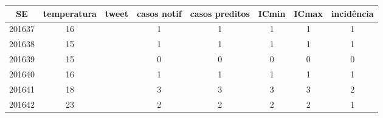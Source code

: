 \begin{tabular}{c|ccccccc}
  \hline
SE & temperatura & tweet & casos notif & casos preditos & ICmin & ICmax & incidência \\ 
  \hline
201637 & 16 &  & 1 & 1 & 1 & 1 & 1 \\ 
  201638 & 15 &  & 1 & 1 & 1 & 1 & 1 \\ 
  201639 & 15 &  & 0 & 0 & 0 & 0 & 0 \\ 
  201640 & 16 &  & 1 & 1 & 1 & 1 & 1 \\ 
  201641 & 18 &  & 3 & 3 & 3 & 3 & 2 \\ 
  201642 & 23 &  & 2 & 2 & 2 & 2 & 1 \\ 
   \hline
\end{tabular}
